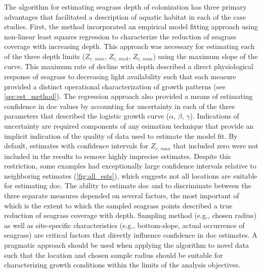 \documentclass[letterpaper,12pt,oneside]{article}\usepackage[]{graphicx}\usepackage[]{color}
\begin{document}
The algorithm for estimating seagrass depth of colonization has three primary advantages that facilitated a description of aquatic habitat in each of the case studies.  First, the method incorporated an empirical model fitting approach using non-linear least squares regression to characterize the reduction of seagrass coverage with increasing depth.  This approach was necessary for estimating each of the three depth limits ($Z_{c,\,min}$, $Z_{c,\,med}$, $Z_{c,\,max}$) using the maximum slope of the curve.  This maximum rate of decline with depth described a direct physiological response of seagrass to decreasing light availability such that each measure provided a distinct operational characterization of growth patterns (see \cref{sec:est_method}).  The regression approach also provided a means of estimating confidence in \ac{doc} values by accounting for uncertainty in each of the three parameters that described the logistic growth curve ($\alpha$, $\beta$, $\gamma$). Indications of uncertainty are required components of any esimation technique that provide an implicit indication of the quality of data used to estimate the model fit.  By default, estimates with confidence intervals for $Z_{c,\,max}$ that included zero were not included in the results to remove highly imprecise estimates.  Despite this restriction, some examples had exceptionally large confidence intervals relative to neighboring estimates (\cref{fig:all_ests}), which suggests not all locations are suitable for estimating \ac{doc}. The ability to estimate \ac{doc} and to discriminate between the three separate measures depended on several factors, the most important of which is the extent to which the sampled seagrass points described a true reduction of seagrass coverage with depth.  Sampling method (e.g., chosen radius) as well as site-specific characteristics (e.g., bottom-slope, actual occurrence of seagrass) are critical factors that directly influence confidence in \ac{doc} estimates.  A pragmatic approach should be used when applying the algorithm to novel data such that the location and chosen sample radius should be suitable for characterizing growth conditions within the limits of the analysis objectives. 
\end{document}
